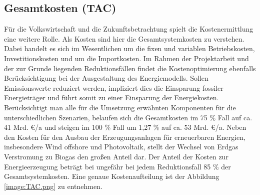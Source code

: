 \subsection{Gesamtkosten (TAC)}
Für die Volkswirtschaft und die Zukunftsbetrachtung spielt die Kostenermittlung eine weitere Rolle. Als Kosten sind hier die Gesamtsystemkosten zu verstehen. Dabei handelt es sich im Wesentlichen um die fixen und variablen Betriebskosten, Investitionskosten und um die Importkosten. Im Rahmen der Projektarbeit und der zur Grunde liegenden Reduktionsfällen findet die Kostenoptimierung ebenfalls Berücksichtigung bei der Ausgestaltung des Energiemodells. Sollen Emissionswerte reduziert werden, impliziert dies die Einsparung fossiler Energieträger und führt somit zu einer Einsparung der Energiekosten. Berücksichtigt man alle für die Umsetzung erwähnten Komponenten für die unterschiedlichen Szenarien, belaufen sich die Gesamtkosten im 75 \% Fall auf ca. 41 Mrd. €/a und steigen im 100 \% Fall um 1,27 \% auf ca. 53 Mrd. €/a. Neben den Kosten für den Ausbau der Erzeugungsanlagen für erneuerbaren Energien, insbesondere Wind offshore und Photovoltaik, stellt der Wechsel von Erdgas Verstromung zu Biogas den großen Anteil dar. Der Anteil der Kosten zur Energieerzeugung beträgt bei ungefähr bei jedem Reduktionsfall 85 \% der Gesamtsystemkosten. Eine genaue Kostenaufteilung ist der Abbildung \ref{image:TAC.png} zu entnehmen. 

